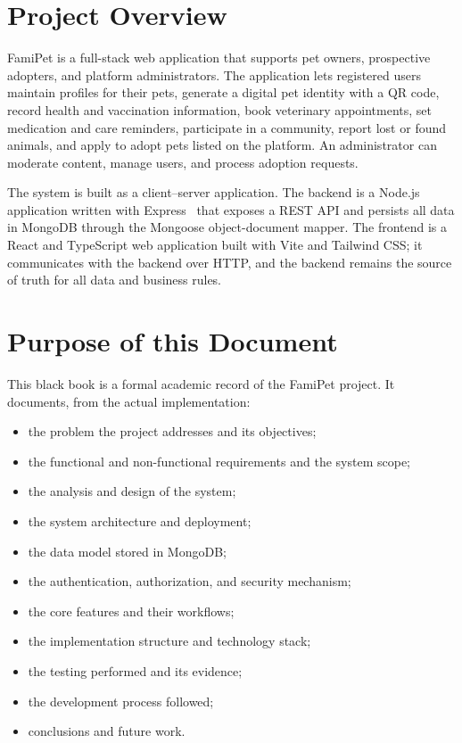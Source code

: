 
\section{Project Overview}

FamiPet is a full-stack web application that supports pet owners, prospective
adopters, and platform administrators. The application lets registered users
maintain profiles for their pets, generate a digital pet identity with a QR code,
record health and vaccination information, book veterinary appointments, set
medication and care reminders, participate in a community, report lost or found
animals, and apply to adopt pets listed on the platform. An administrator can
moderate content, manage users, and process adoption requests.

The system is built as a client--server application. The backend is a Node.js~\cite{nodejs}
application written with Express~\cite{express} that exposes a REST API and persists all data in
MongoDB through the Mongoose object-document mapper. The frontend is a React and
TypeScript web application built with Vite and Tailwind CSS; it communicates with
the backend over HTTP, and the backend remains the source of truth for all data
and business rules.

\section{Purpose of this Document}

This black book is a formal academic record of the FamiPet project. It documents,
from the actual implementation:

\begin{itemize}
    \item the problem the project addresses and its objectives;
    \item the functional and non-functional requirements and the system scope;
    \item the analysis and design of the system;
    \item the system architecture and deployment;
    \item the data model stored in MongoDB;
    \item the authentication, authorization, and security mechanism;
    \item the core features and their workflows;
    \item the implementation structure and technology stack;
    \item the testing performed and its evidence;
    \item the development process followed;
    \item conclusions and future work.
\end{itemize}

